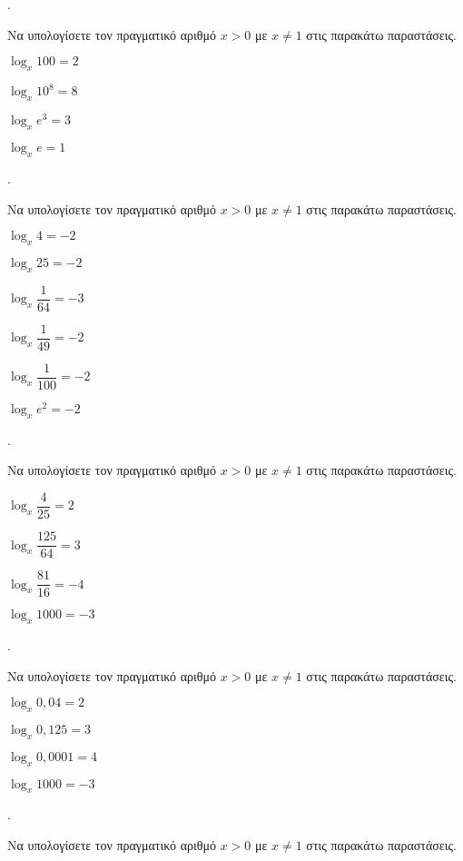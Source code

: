 \documentclass[11pt,a4paper,twocolumn]{article}
\newcounter{askhsh}
\newcommand{\askhsh}{{\large\theaskhsh.}\ \addtocounter{askhsh}{1}}
\begin{document}
\askhsh Να υπολογίσετε τον πραγματικό αριθμό $ x>0$ με $ x\neq 1 $ στις παρακάτω παραστάσεις.
\begin{multicols}{2}
\begin{alist}
\item $ \log_{x}{100}=2 $
\item $ \log_{x}{10^8}=8 $
\item $ \log_{x}{e^3}=3 $
\item $ \log_{x}{e}=1 $
\end{alist}
\end{multicols}
\askhsh Να υπολογίσετε τον πραγματικό αριθμό $ x>0$ με $ x\neq 1 $ στις παρακάτω παραστάσεις.
\begin{multicols}{2}
\begin{alist}
\item $ \log_{x}{4}=-2 $
\item $ \log_{x}{25}=-2 $
\item $ \log_{x}{\dfrac{1}{64}}=-3 $
\item $ \log_{x}{\dfrac{1}{49}}=-2 $
\item $ \log_{x}{\dfrac{1}{100}}=-2 $
\item $ \log_{x}{e^2}=-2 $
\end{alist}
\end{multicols}
\askhsh Να υπολογίσετε τον πραγματικό αριθμό $ x>0$ με $ x\neq 1 $ στις παρακάτω παραστάσεις.
\begin{multicols}{2}
\begin{alist}
\item $ \log_{x}{\dfrac{4}{25}}=2 $
\item $ \log_{x}{\dfrac{125}{64}}=3 $
\item $ \log_{x}{\dfrac{81}{16}}=-4 $
\item $ \log_{x}{1000}=-3 $
\end{alist}
\end{multicols}
\askhsh Να υπολογίσετε τον πραγματικό αριθμό $ x>0$ με $ x\neq 1 $ στις παρακάτω παραστάσεις.
\begin{multicols}{2}
\begin{alist}
\item $ \log_{x}{0{,}04}=2 $
\item $ \log_{x}{0{,}125}=3 $
\item $ \log_{x}{0{,}0001}=4 $
\item $ \log_{x}{1000}=-3 $
\end{alist}
\end{multicols}
\askhsh Να υπολογίσετε τον πραγματικό αριθμό $ x>0 $ με $ x\neq 1 $ στις παρακάτω παραστάσεις.
\end{document}
